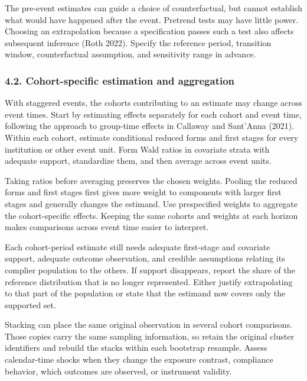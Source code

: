 \documentclass[
  11pt,
]{article}
\begin{document}
The pre-event estimates can guide a choice of counterfactual, but cannot
establish what would have happened after the event. Pretrend tests may
have little power. Choosing an extrapolation because a specification
passes such a test also affects subsequent inference (Roth 2022).
Specify the reference period, transition window, counterfactual
assumption, and sensitivity range in advance.

\hypertarget{cohort-specific-estimation-and-aggregation}{%
\subsubsection{4.2. Cohort-specific estimation and
aggregation}\label{cohort-specific-estimation-and-aggregation}}

With staggered events, the cohorts contributing to an estimate may
change across event times. Start by estimating effects separately for
each cohort and event time, following the approach to group-time effects
in Callaway and Sant'Anna (2021). Within each cohort, estimate
conditional reduced forms and first stages for every institution or
other event unit. Form Wald ratios in covariate strata with adequate
support, standardize them, and then average across event units.

Taking ratios before averaging preserves the chosen weights. Pooling the
reduced forms and first stages first gives more weight to components
with larger first stages and generally changes the estimand. Use
prespecified weights to aggregate the cohort-specific effects. Keeping
the same cohorts and weights at each horizon makes comparisons across
event time easier to interpret.

Each cohort-period estimate still needs adequate first-stage and
covariate support, adequate outcome observation, and credible
assumptions relating its complier population to the others. If support
disappears, report the share of the reference distribution that is no
longer represented. Either justify extrapolating to that part of the
population or state that the estimand now covers only the supported set.

Stacking can place the same original observation in several cohort
comparisons. Those copies carry the same sampling information, so retain
the original cluster identifiers and rebuild the stacks within each
bootstrap resample. Assess calendar-time shocks when they change the
exposure contrast, compliance behavior, which outcomes are observed, or
instrument validity.
\end{document}

